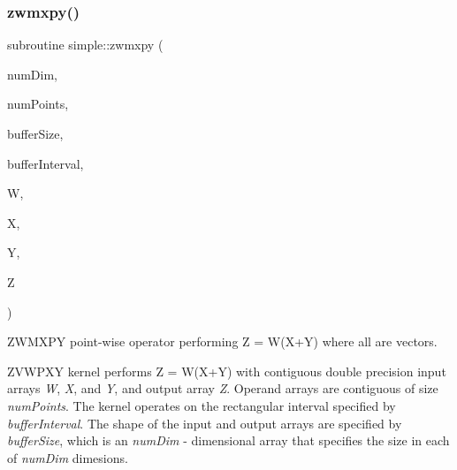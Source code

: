 \subsubsection{\texorpdfstring{zwmxpy()}{zwmxpy()}}
{\footnotesize\ttfamily subroutine simple\+::zwmxpy (\begin{DoxyParamCaption}\item[{integer(kind=4), intent(in)}]{num\+Dim,  }\item[{integer(kind=8), intent(in)}]{num\+Points,  }\item[{integer(kind=8), dimension(numdim), intent(in)}]{buffer\+Size,  }\item[{integer(kind=8), dimension(2$\ast$numdim), intent(in)}]{buffer\+Interval,  }\item[{real(kind=8), dimension(numpoints), intent(in)}]{W,  }\item[{real(kind=8), dimension(numpoints), intent(in)}]{X,  }\item[{real(kind=8), dimension(numpoints), intent(in)}]{Y,  }\item[{real(kind=8), dimension(numpoints), intent(out)}]{Z }\end{DoxyParamCaption})}



Z\+W\+M\+X\+PY point-\/wise operator performing Z = W(X+Y) where all are vectors. 

Z\+V\+W\+P\+XY kernel performs Z = W(X+Y) with contiguous double precision input arrays {\itshape W}, {\itshape X}, and {\itshape Y}, and output array {\itshape Z}. Operand arrays are contiguous of size {\itshape num\+Points}. The kernel operates on the rectangular interval specified by {\itshape buffer\+Interval}. The shape of the input and output arrays are specified by {\itshape buffer\+Size}, which is an {\itshape num\+Dim} -\/ dimensional array that specifies the size in each of {\itshape num\+Dim} dimesions.


